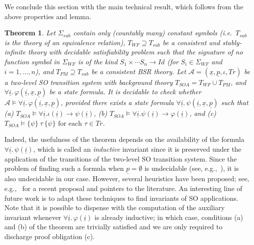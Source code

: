 \documentclass[conference]{IEEEtran}
\newtheorem{theorem}{Theorem}
\newcommand{\close}{\IEEEQEDclosed}
\begin{document}
We conclude this section with the main technical result, which follows from
the above properties and lemma.
\begin{theorem}
  Let $\Sigma_\mathit{sub}$ contain only (countably many) constant symbols
  (i.e.\ $T_\mathit{sub}$ is the theory of an equivalence relation), $T_\mathit{WF}
  \supseteq T_\mathit{sub}$ be a consistent and stably-infinite theory with
  decidable satisfiability problem such that the signature of no
  function symbol in $\Sigma_\mathit{WF}$ is of the kind $S_1 \times \cdots
  S_n \rightarrow \mathit{Id}$ (for $S_i \in \Sigma_\mathit{WF}$ and
  $i=1,...,n$), and $T_\mathit{PM} \supseteq T_\mathit{sub}$ be a consistent BSR
  theory.  Let
  $\mathcal{A}=(\underline{x},\underline{p},\iota,\mathit{Tr})$ be a
  two-level SO transition system with background theory 
  $T_\mathit{SOA}=T_\mathit{WF} \cup T_\mathit{PM}$, and
  $\forall \underline{i}.\, \varphi(\underline{i},\underline{x},\underline{p})$ be
  a state formula.  It is decidable to check whether $\mathcal{A}
  \models \forall
  \underline{i}.\, \varphi(\underline{i},\underline{x},\underline{p})$,
  provided there exists a state formula $\forall
  \underline{i}.\, \psi(\underline{i},\underline{x},\underline{p})$ such
  that (a) $T_\mathit{SOA} \models \forall \underline{i}.\iota(\underline{i})
  \rightarrow \psi(\underline{i})$, (b) $T_\mathit{SOA} \models \forall
  \underline{i}.\psi(\underline{i}) \rightarrow
  \varphi(\underline{i})$, and (c) $T_\mathit{SOA} \models \{ \psi\}~ \tau~
  \{ \psi\} \mbox{ for each } \tau\in \mathit{Tr}$. \hfill \close
\end{theorem}

Indeed, the usefulness of the theorem depends on the availability of
the formula $\forall \underline{i}.\, \psi(\underline{i})$, which is
called an \emph{inductive} invariant since it is preserved under the
application of the transitions of the two-level SO transition system.  Since the
problem of finding such a formula when $\underline{p}=\emptyset$ is
undecidable (see, e.g.,~\cite{manna-pnueli-book}), it is also
undecidable in our case.  However, several heuristics have been
proposed; see, e.g.,~\cite{bradley-manna}
for a recent proposal and pointers to the literature.  An interesting
line of future work is to adapt these techniques to find invariants of
SO applications.  Note that it is possible to dispense with the
computation of the auxiliary invariant whenever $\forall
\underline{i}.\, \varphi(\underline{i})$ is already inductive; in which
case, conditions (a) and (b) of the theorem are trivially satisfied and
we are only required to discharge proof obligation (c).
\end{document}

